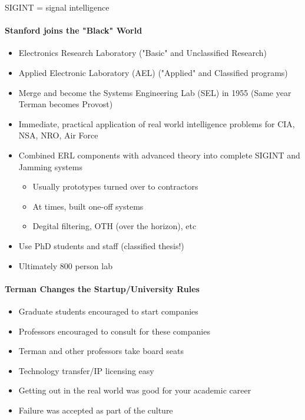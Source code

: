 SIGINT = signal intelligence


\paragraph{Stanford joins the "Black" World}

\begin{itemize}
    \item Electronics Research Laboratory ("Basic" and Unclassified Research)
    \item Applied Electronic Laboratory (AEL) ("Applied" and Classified programs)
    \item Merge and become the Systems Engineering Lab (SEL) in 1955 (Same year
        Terman becomes Provost)
    \item Immediate, practical application of real world intelligence problems
        for CIA, NSA, NRO, Air Force
    \item Combined ERL components with advanced theory into complete SIGINT
        and Jamming systems
        \begin{itemize}
            \item Usually prototypes turned over to contractors
            \item At times, built one-off systems
            \item Degital filtering, OTH (over the horizon), etc
        \end{itemize}
    \item Use PhD students and staff (classified thesis!)
    \item Ultimately 800 person lab
\end{itemize}

\paragraph{Terman Changes the Startup/University Rules}

\begin{itemize}
    \item Graduate students encouraged to start companies
    \item Professors encouraged to consult for these companies
    \item Terman and other professors take board seats
    \item Technology transfer/IP licensing easy
    \item Getting out in the real world was good for your academic career
    \item Failure was accepted as part of the culture
\end{itemize}

